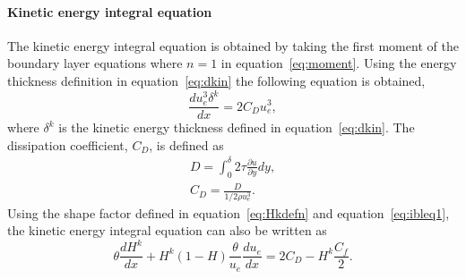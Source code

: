\paragraph{Kinetic energy integral equation}

The kinetic energy integral equation is obtained by taking the first moment of the boundary layer equations where $n=1$ in equation~\ref{eq:moment}.
Using the energy thickness definition in equation~\ref{eq:dkin} the following equation is obtained,
\begin{equation}
\frac{d u_e^3\delta^k}{d x} = 2C_D u_e^3,
\label{eq:ibleq2int}
\end{equation}
where $\delta^k$ is the kinetic energy thickness defined in equation~\ref{eq:dkin}. The dissipation coefficient, $C_D$, is defined as
\begin{align*}
D = \int_{0}^{\delta}2\tau\frac{\partial u}{\partial y}dy, \\
C_D = \frac{D}{1/2\rho u_e^3}.
\end{align*}
Using the shape factor defined in equation~\ref{eq:Hkdefn} and equation~\ref{eq:ibleq1}, the kinetic energy integral equation can also be written as
\begin{equation}
\theta\frac{dH^k}{dx} + H^k(1-H)\frac{\theta}{u_e}\frac{du_e}{dx} = 2C_D - H^k\frac{C_f}{2}.
\label{eq:ibleq2}
\end{equation}
